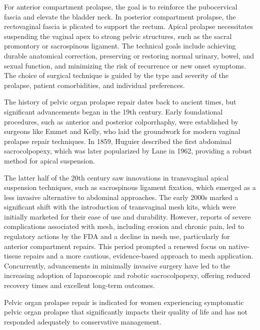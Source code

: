 For anterior compartment prolapse, the goal is to reinforce the pubocervical fascia and elevate the bladder neck. In posterior compartment prolapse, the rectovaginal fascia is plicated to support the rectum. Apical prolapse necessitates suspending the vaginal apex to strong pelvic structures, such as the sacral promontory or sacrospinous ligament. The technical goals include achieving durable anatomical correction, preserving or restoring normal urinary, bowel, and sexual function, and minimizing the risk of recurrence or new onset symptoms. The choice of surgical technique is guided by the type and severity of the prolapse, patient comorbidities, and individual preferences.

The history of pelvic organ prolapse repair dates back to ancient times, but significant advancements began in the 19th century. Early foundational procedures, such as anterior and posterior colporrhaphy, were established by surgeons like Emmet and Kelly, who laid the groundwork for modern vaginal prolapse repair techniques. In 1859, Huguier described the first abdominal sacrocolpopexy, which was later popularized by Lane in 1962, providing a robust method for apical suspension.

The latter half of the 20th century saw innovations in transvaginal apical suspension techniques, such as sacrospinous ligament fixation, which emerged as a less invasive alternative to abdominal approaches. The early 2000s marked a significant shift with the introduction of transvaginal mesh kits, which were initially marketed for their ease of use and durability. However, reports of severe complications associated with mesh, including erosion and chronic pain, led to regulatory actions by the FDA and a decline in mesh use, particularly for anterior compartment repairs. This period prompted a renewed focus on native-tissue repairs and a more cautious, evidence-based approach to mesh application. Concurrently, advancements in minimally invasive surgery have led to the increasing adoption of laparoscopic and robotic sacrocolpopexy, offering reduced recovery times and excellent long-term outcomes.

Pelvic organ prolapse repair is indicated for women experiencing symptomatic pelvic organ prolapse that significantly impacts their quality of life and has not responded adequately to conservative management.

